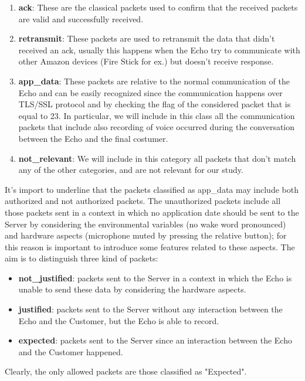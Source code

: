 \documentclass[sigconf]{acmart}
\begin{document}
\begin{enumerate}
        \item \textbf{ack}: These are the classical packets used to confirm that the received packets are valid and successfully received.
        \item \textbf{retransmit}: These packets are used to retransmit the data that didn't received an ack, usually this happens when the Echo try to communicate with other Amazon devices (Fire Stick for ex.) but doesn't receive response.
        \item \textbf{app\_data}: These packets are relative to the normal communication of the Echo and can be easily recognized since the communication happens over TLS/SSL protocol and by checking the flag of the considered packet that is equal to 23.
        In particular, we will include in this class all the communication packets that include also recording of voice occurred during the conversation between the Echo and the final costumer.
        \item \textbf{not\_relevant}: We will include in this category all packets that don't match any of the other categories, and are not relevant for our study.
    \end{enumerate}
    It's import to underline that the packets classified as app\_data may include both authorized and not authorized packets.
    The unauthorized packets include all those packets sent in a context in which no application date should be sent to the Server by considering the environmental variables (no wake word pronounced) and hardware aspects (microphone muted by pressing the relative button); for this reason is important to introduce some features related to these aspects.
    The aim is to distinguish three kind of packets:
    \begin{itemize}
        \item \textbf{not\_justified}: packets sent to the Server in a context in which the Echo is unable to send these data by considering the hardware aspects.
        \item \textbf{justified}: packets sent to the Server without any interaction between the Echo and the Customer, but the Echo is able to record.
        \item \textbf{expected}: packets sent to the Server since an interaction between the Echo and the Customer happened.
    \end{itemize}
    Clearly, the only allowed packets are those classified as "Expected".
\end{document}
